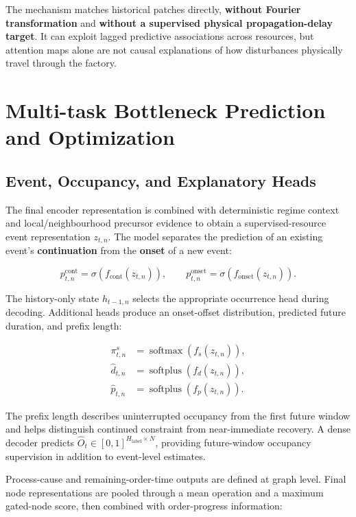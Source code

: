 The mechanism matches historical patches directly, \textbf{without Fourier transformation} and \textbf{without a supervised physical propagation-delay target}. It can exploit lagged predictive associations across resources, but attention maps alone are not causal explanations of how disturbances physically travel through the factory.

\section{Multi-task Bottleneck Prediction and Optimization}\label{multi-task-bottleneck-prediction-and-optimization}

\subsection{Event, Occupancy, and Explanatory Heads}\label{event-occupancy-and-explanatory-heads}

The final encoder representation is combined with deterministic regime context and local/neighbourhood precursor evidence to obtain a supervised-resource event representation \(z_{t,n}\). The model separates the prediction of an existing event's \textbf{continuation} from the \textbf{onset} of a new event:

\[
p^{\mathrm{cont}}_{t,n}=\sigma\!\left(f_{\mathrm{cont}}(z_{t,n})\right),\qquad
p^{\mathrm{onset}}_{t,n}=\sigma\!\left(f_{\mathrm{onset}}(z_{t,n})\right).
\]

The history-only state \(h_{t-1,n}\) selects the appropriate occurrence head during decoding. Additional heads produce an onset-offset distribution, predicted future duration, and prefix length:

\[
\begin{aligned}
\pi^s_{t,n}&=\operatorname{softmax}(f_s(z_{t,n})),\\
\hat d_{t,n}&=\operatorname{softplus}(f_d(z_{t,n})),\\
\hat p_{t,n}&=\operatorname{softplus}(f_p(z_{t,n})).
\end{aligned}
\]

The prefix length describes uninterrupted occupancy from the first future window and helps distinguish continued constraint from near-immediate recovery. A dense decoder predicts \(\hat O_t\in[0,1]^{H_{\mathrm{label}}\times N}\), providing future-window occupancy supervision in addition to event-level estimates.

Process-cause and remaining-order-time outputs are defined at graph level. Final node representations are pooled through a mean operation and a maximum gated-node score, then combined with order-progress information:

